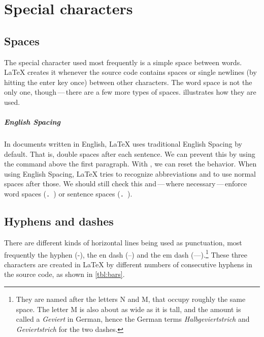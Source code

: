 \chapter{Special characters}

\label{sec:special-characters}

\section{Spaces}

The special character used most frequently is a simple space between words.
\LaTeX{} creates it whenever the source code contains spaces or single newlines (by hitting the enter key once) between other characters.
The word space is not the only one, though\,---\,there are a few more types of spaces.
 illustrates how they are used.


\paragraph{English Spacing}
In documents written in English, \LaTeX{} uses traditional English Spacing by default. That is, double spaces after each sentence.
We can prevent this by using the command  above the first paragraph.
With , we can reset the behavior.
When using English Spacing, \LaTeX{} tries to recognize abbreviations and to use normal spaces after those.
We should still check this and\,---\,where necessary\,---\,enforce word spaces (\texttt{.\ }) or sentence spaces (\texttt{\@. }).

\section{Hyphens and dashes}
There are different kinds of horizontal lines being used as punctuation,
most frequently the hyphen (-), the en dash (–) and the em dash (—).\footnote{They are named after the letters N and M,
that occupy roughly the same space.
The letter M is also about as wide as it is tall, and the amount is called a \emph{Geviert} in German, hence the German terms \emph{Halbgeviertstrich} and \emph{Geviertstrich} for the two dashes.}
These three characters are created in \LaTeX{} by different numbers of consecutive hyphens in the source code,
as shown in \cref{tbl:bars}.

